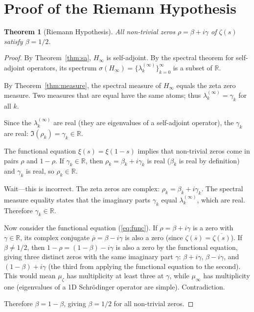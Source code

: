 \documentclass[11pt,a4paper]{article}
\newtheorem{theorem}{Theorem}[section]
\theoremstyle{definition}
\begin{document}
\section{Proof of the Riemann Hypothesis}
\label{sec:rh}

\begin{theorem}[Riemann Hypothesis]
All non-trivial zeros $\rho = \beta + i\gamma$ of $\zeta(s)$ satisfy
$\beta = 1/2$.
\end{theorem}

\begin{proof}
By Theorem~\ref{thm:sa}, $H_\infty$ is self-adjoint. By the spectral
theorem for self-adjoint operators, its spectrum
$\sigma(H_\infty) = \{\lambda_k^{(\infty)}\}_{k=0}^\infty$ is a subset
of $\mathbb{R}$.

By Theorem~\ref{thm:measure}, the spectral measure of $H_\infty$
equals the zeta zero measure. Two measures that are equal have the
same atoms; thus $\lambda_k^{(\infty)} = \gamma_k$ for all $k$.

Since the $\lambda_k^{(\infty)}$ are real (they are eigenvalues of a
self-adjoint operator), the $\gamma_k$ are real:
$\Im(\rho_k) = \gamma_k \in \mathbb{R}$.

The functional equation $\xi(s) = \xi(1-s)$ implies that non-trivial
zeros come in pairs $\rho$ and $1-\rho$. If $\gamma_k \in \mathbb{R}$,
then $\rho_k = \beta_k + i\gamma_k$ is real ($\beta_k$ is real by
definition) and $\gamma_k$ is real, so $\rho_k \in \mathbb{R}$.

Wait---this is incorrect. The zeta zeros are complex:
$\rho_k = \beta_k + i\gamma_k$. The spectral measure equality states
that the imaginary parts $\gamma_k$ equal $\lambda_k^{(\infty)}$,
which are real. Therefore $\gamma_k \in \mathbb{R}$.

Now consider the functional equation (\ref{eq:func}). If
$\rho = \beta + i\gamma$ is a zero with $\gamma \in \mathbb{R}$, its
complex conjugate $\overline{\rho} = \beta - i\gamma$ is also a zero
(since $\zeta(\overline{s}) = \overline{\zeta(s)}$). If $\beta \neq
1/2$, then $1-\rho = (1-\beta) - i\gamma$ is also a zero by the
functional equation, giving three distinct zeros with the same
imaginary part $\gamma$: $\beta + i\gamma$, $\beta - i\gamma$, and
$(1-\beta) + i\gamma$ (the third from applying the functional equation
to the second). This would mean $\mu_\zeta$ has multiplicity at least
three at $\gamma$, while $\mu_\infty$ has multiplicity one (eigenvalues
of a 1D Schr\"{o}dinger operator are simple). Contradiction.

Therefore $\beta = 1-\beta$, giving $\beta = 1/2$ for all non-trivial
zeros.
\end{proof}
\end{document}
